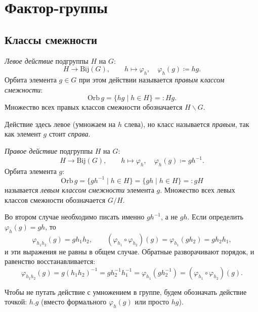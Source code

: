 \section{Фактор-группы}


\subsection*{Классы смежности}

\begin{definition}
    \emph{Левое действие} подгруппы $H$ на $G$:
    \[
        H \to \mathrm{Bij}(G), \qquad h \mapsto \varphi_h,\quad \varphi_h(g) \coloneqq hg.
    \]
    Орбита элемента $g \in G$ при этом действии называется \emph{правым классом смежности}:
    \[
        \mathrm{Orb}\, g = \{hg \mid h \in H\} =: Hg.
    \]
    Множество всех правых классов смежности обозначается $H \backslash G$.
\end{definition}

\begin{remark}
    Действие здесь левое (умножаем на $h$ слева), но класс называется \emph{правым}, так как элемент
    $g$ стоит \emph{справа}.
\end{remark}

\begin{definition}
    \emph{Правое действие} подгруппы $H$ на $G$:
    \[
        H \to \mathrm{Bij}(G), \qquad h \mapsto \varphi_h,\quad \varphi_h(g) \coloneqq gh^{-1}.
    \]
    Орбита элемента $g$:
    \[
        \mathrm{Orb}\, g = \{gh^{-1} \mid h \in H\} = \{gh \mid h \in H\} =: gH
    \]
    называется \emph{левым классом смежности} элемента $g$.
    Множество всех левых классов смежности обозначается $G / H$.
\end{definition}

\begin{remark}
    Во втором случае необходимо писать именно $gh^{-1}$, а не $gh$. Если определить $\varphi_h(g) = gh$, то
    \[
        \varphi_{h_1 h_2}(g) = g h_1 h_2, \qquad (\varphi_{h_1} \circ \varphi_{h_2})(g) = \varphi_{h_1}
        (g h_2) = g h_2 h_1,
    \]
    и эти выражения не равны в общем случае. Обратные разворачивают порядок, и равенство восстанавливается:
    \[
        \varphi_{h_1 h_2}(g) = g(h_1 h_2)^{-1} = g h_2^{-1} h_1^{-1}
        = \varphi_{h_1}(g h_2^{-1}) = (\varphi_{h_1} \circ \varphi_{h_2})(g).
    \]
\end{remark}

\begin{remark}
    Чтобы не путать действие с умножением в группе, будем обозначать действие точкой: $h . g$
    (вместо формального $\varphi_h(g)$ или просто $hg$).
\end{remark}

